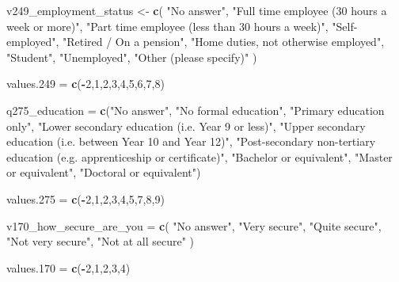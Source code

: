 \documentclass[
]{article}
\newenvironment{Shaded}{\begin{snugshade}}{\end{snugshade}}
\newcommand{\DecValTok}[1]{\textcolor[rgb]{0.00,0.00,0.81}{#1}}
\newcommand{\FloatTok}[1]{\textcolor[rgb]{0.00,0.00,0.81}{#1}}
\newcommand{\FunctionTok}[1]{\textcolor[rgb]{0.13,0.29,0.53}{\textbf{#1}}}
\newcommand{\NormalTok}[1]{#1}
\newcommand{\OtherTok}[1]{\textcolor[rgb]{0.56,0.35,0.01}{#1}}
\newcommand{\SpecialCharTok}[1]{\textcolor[rgb]{0.81,0.36,0.00}{\textbf{#1}}}
\newcommand{\StringTok}[1]{\textcolor[rgb]{0.31,0.60,0.02}{#1}}
\begin{document}
\begin{Shaded}
\begin{Highlighting}[]
\NormalTok{v249\_employment\_status }\OtherTok{\textless{}{-}} \FunctionTok{c}\NormalTok{(}
  \StringTok{"No answer"}\NormalTok{,}
  \StringTok{"Full time employee (30 hours a week or more)"}\NormalTok{,}
  \StringTok{"Part time employee (less than 30 hours a week)"}\NormalTok{,}
  \StringTok{"Self{-}employed"}\NormalTok{,}
  \StringTok{"Retired / On a pension"}\NormalTok{,}
  \StringTok{"Home duties, not otherwise employed"}\NormalTok{,}
  \StringTok{"Student"}\NormalTok{,}
  \StringTok{"Unemployed"}\NormalTok{,}
  \StringTok{"Other (please specify)"}
\NormalTok{)}

\NormalTok{values}\FloatTok{.249} \OtherTok{=} \FunctionTok{c}\NormalTok{(}\SpecialCharTok{{-}}\DecValTok{2}\NormalTok{,}\DecValTok{1}\NormalTok{,}\DecValTok{2}\NormalTok{,}\DecValTok{3}\NormalTok{,}\DecValTok{4}\NormalTok{,}\DecValTok{5}\NormalTok{,}\DecValTok{6}\NormalTok{,}\DecValTok{7}\NormalTok{,}\DecValTok{8}\NormalTok{)}

\NormalTok{q275\_education }\OtherTok{=} \FunctionTok{c}\NormalTok{(}\StringTok{"No answer"}\NormalTok{,}
\StringTok{"No formal education"}\NormalTok{,}
\StringTok{"Primary education only"}\NormalTok{,}
\StringTok{"Lower secondary education (i.e. Year 9 or less)"}\NormalTok{,}
\StringTok{"Upper secondary education (i.e. between Year 10 and Year 12)"}\NormalTok{,}
\StringTok{"Post{-}secondary non{-}tertiary education (e.g. apprenticeship or certificate)"}\NormalTok{,}
\StringTok{"Bachelor or equivalent"}\NormalTok{,}
\StringTok{"Master or equivalent"}\NormalTok{,}
\StringTok{"Doctoral or equivalent"}\NormalTok{)}

\NormalTok{values}\FloatTok{.275} \OtherTok{=} \FunctionTok{c}\NormalTok{(}\SpecialCharTok{{-}}\DecValTok{2}\NormalTok{,}\DecValTok{1}\NormalTok{,}\DecValTok{2}\NormalTok{,}\DecValTok{3}\NormalTok{,}\DecValTok{4}\NormalTok{,}\DecValTok{5}\NormalTok{,}\DecValTok{7}\NormalTok{,}\DecValTok{8}\NormalTok{,}\DecValTok{9}\NormalTok{)}

\NormalTok{v170\_how\_secure\_are\_you }\OtherTok{=} \FunctionTok{c}\NormalTok{(}
\StringTok{"No answer"}\NormalTok{,}
\StringTok{"Very secure"}\NormalTok{,}
\StringTok{"Quite secure"}\NormalTok{,}
\StringTok{"Not very secure"}\NormalTok{,}
\StringTok{"Not at all secure"}
\NormalTok{)}

\NormalTok{values}\FloatTok{.170} \OtherTok{=} \FunctionTok{c}\NormalTok{(}\SpecialCharTok{{-}}\DecValTok{2}\NormalTok{,}\DecValTok{1}\NormalTok{,}\DecValTok{2}\NormalTok{,}\DecValTok{3}\NormalTok{,}\DecValTok{4}\NormalTok{)}


\end{Highlighting}
\end{Shaded}
\end{document}
